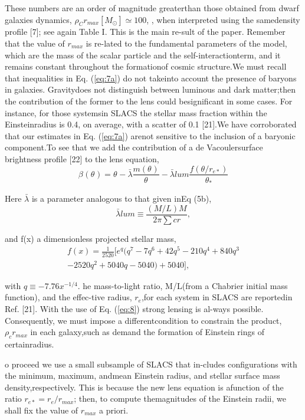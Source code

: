 \documentclass[10pt]{article}
\begin{document}
\begin{multicols}{2}
These  numbers  are  an  order  of  magnitude  greaterthan   those   obtained   from   dwarf   galaxies   dynamics, \(\rho_{C}r_{max}[M_{\odot}]\simeq 100\), , when interpreted using the samedensity profile [7]; see again Table I. This is the main re-sult of the paper.  Remember that the value of \(r_{max}\) is re-lated to the fundamental parameters of the model, which are the mass of the scalar particle and the self-interactionterm, and it remains constant throughout the formationof cosmic structure.We must recall that inequalities in Eq.  (\ref{eq:7a}) do not takeinto account the presence of baryons in galaxies.  Gravitydoes not distinguish between luminous and dark matter;then the contribution of the former to the lens could besignificant in some cases.  For instance, for those systemsin SLACS the stellar mass fraction within the Einsteinradius is 0.4, on average, with a scatter of 0.1 [21].We have corroborated that our estimates in Eq. (\ref{eq:7a}) arenot sensitive to the inclusion of a baryonic component.To  see  that  we  add  the  contribution  of  a  de  Vacoulersurface brightness profile [22] to the lens equation,
\begin{equation}\label{eq:8a}
	\beta_{}(\theta_{})=\theta_{}-\bar{\lambda} \frac{m(\theta_{})}{\theta_{}}-\bar{\lambda}{lum} \frac{f(\theta{}/r_{e*})}{\theta_{*}}
\end{equation}

 Here \(\bar\lambda\) is  a  parameter  analogous  to  that  given  inEq (5b),
\begin{equation}\tag{8b}
	\bar{\lambda}{lum}\equiv \frac{(M/L)M}{2\pi\sum{cr}}, 
\end{equation} 

and f(x) a dimensionless projected stellar mass,
\begin{multline*}\tag{8c}
	 f(x)=\frac{1}{2520}[e^{q}(q^{7}-7q^{6}+42q^{5}-210q^{4}+840q^{3} \\ -2520q^{2}+5040q-5040)+5040],
\end{multline*}

with \(q\equiv -7.76x^{-1/4}\). he  mass-to-light  ratio, M/L(from  a  Chabrier  initial  mass  function),  and  the  effec-tive radius, \(r_{e}\),for each system in SLACS are reportedin Ref. [21].  With the use of Eq.  (\ref{eq:8}) strong lensing is al-ways possible.  Consequently, we must impose a differentcondition to constrain the product, \(\rho_{c}r_{max}\) in each galaxy,such as demand the formation of Einstein rings of certainradius.

o proceed we use a small subsample of SLACS that in-cludes configurations with the minimum, maximum, andmean  Einstein  radius,  and  stellar  surface  mass  density,respectively.  This is because the new lens equation is afunction of the ratio \(r_{e*}=r_{e}/r_{max}\); then, to compute themagnitudes of the Einstein radii, we shall fix the value of \(r_{max}\) a priori. 


\end{multicols}
\end{document}
